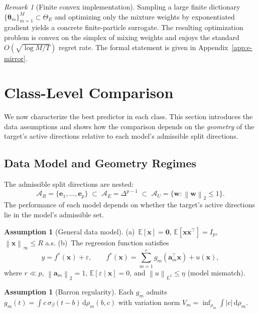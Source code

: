 \documentclass[11pt,a4paper]{article}
\theoremstyle{definition}
\newtheorem{assumption}[theorem]{Assumption}
\theoremstyle{remark}
\newtheorem{remark}[theorem]{Remark}
\newcommand{\E}{\mathbb{E}}
\newcommand{\vtheta}{\boldsymbol{\theta}}
\newcommand{\vw}{\mathbf{w}}
\newcommand{\vx}{\mathbf{x}}
\newcommand{\va}{\mathbf{a}}
\newcommand{\ve}{\mathbf{e}}
\newcommand{\simplex}{\Delta^{p-1}}
\newcommand{\dd}{\mathrm{d}}
\newcommand{\norm}[1]{\left\|#1\right\|}
\begin{document}
\begin{remark}[Finite convex implementation]
  \label{rem:E-eg}
  Sampling a large finite dictionary
  \(\{\vtheta_m\}_{m=1}^M \subset \Theta_E\)
  and optimizing only the mixture weights by
  exponentiated gradient yields a concrete
  finite-particle surrogate.
  The resulting optimization problem is convex on
  the simplex of mixing weights and enjoys the
  standard
  \(O(\sqrt{\log M / T})\) regret rate.
  The formal statement is given in
  Appendix~\ref{app:e-mirror}.
\end{remark}


\section{Class-Level Comparison}
\label{sec:class}

We now characterize the best predictor in each
class.
This section introduces the data assumptions
and shows how the comparison depends on
the \emph{geometry} of the target's active
directions relative to each model's admissible
split directions.


\subsection{Data Model and Geometry Regimes}

The admissible split directions are nested:
\[
  \mathcal{A}_R = \{\ve_1,\dots,\ve_p\}
  \;\subset\;
  \mathcal{A}_E = \simplex
  \;\subset\;
  \mathcal{A}_U = \{\vw : \norm{\vw}_2 \le 1\}.
\]
The performance of each model depends on whether
the target's active directions lie in the model's
admissible set.

\begin{assumption}[General data model]
  \label{asm:data}
  (a)~$\E[\vx] = \mathbf{0}$,
  $\E[\vx\vx^\top] = I_p$,
  $\norm{\vx}_\infty \le R$ a.s.
  (b)~The regression function satisfies
  \[
    y = f^*(\vx) + \varepsilon,
    \qquad
    f^*(\vx) = \sum_{m=1}^r g_m(\va_m^\top\vx)
    + u(\vx),
  \]
  where $r \ll p$,
  $\norm{\va_m}_2 = 1$,
  $\E[\varepsilon \mid \vx] = 0$,
  and $\norm{u}_{L^2} \le \eta$
  (model mismatch).
\end{assumption}

\begin{assumption}[Barron regularity]
  \label{asm:barron}
  Each $g_m$ admits
  $g_m(t) = \int c\,\sigma_\beta(t{-}b)\,
  \dd\rho_m(b,c)$
  with variation norm
  $V_m = \inf_{\rho_m}\int|c|\,\dd\rho_m$.
\end{assumption}
\end{document}
